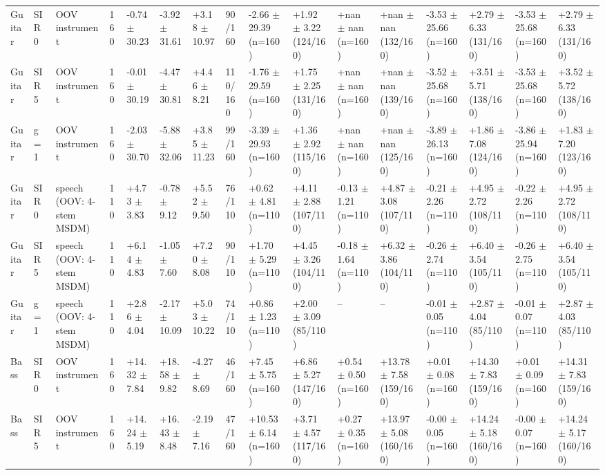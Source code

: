 \begin{tabular}{llllllllllllllll}
Guitar & SIR 0 & OOV instrument & 160 & -0.74 $\pm$ 30.23 & -3.92 $\pm$ 31.61 & +3.18 $\pm$ 10.97 & 90/160 & -2.66 $\pm$ 29.39 (n=160) & +1.92 $\pm$ 3.22 (124/160) & +nan $\pm$ nan (n=160) & +nan $\pm$ nan (132/160) & -3.53 $\pm$ 25.66 (n=160) & +2.79 $\pm$ 6.33 (131/160) & -3.53 $\pm$ 25.68 (n=160) & +2.79 $\pm$ 6.33 (131/160)\\
Guitar & SIR 5 & OOV instrument & 160 & -0.01 $\pm$ 30.19 & -4.47 $\pm$ 30.81 & +4.46 $\pm$ 8.21 & 110/160 & -1.76 $\pm$ 29.59 (n=160) & +1.75 $\pm$ 2.25 (131/160) & +nan $\pm$ nan (n=160) & +nan $\pm$ nan (139/160) & -3.52 $\pm$ 25.68 (n=160) & +3.51 $\pm$ 5.71 (138/160) & -3.53 $\pm$ 25.68 (n=160) & +3.52 $\pm$ 5.72 (138/160)\\
Guitar & g = 1 & OOV instrument & 160 & -2.03 $\pm$ 30.70 & -5.88 $\pm$ 32.06 & +3.85 $\pm$ 11.23 & 99/160 & -3.39 $\pm$ 29.93 (n=160) & +1.36 $\pm$ 2.92 (115/160) & +nan $\pm$ nan (n=160) & +nan $\pm$ nan (125/160) & -3.89 $\pm$ 26.13 (n=160) & +1.86 $\pm$ 7.08 (124/160) & -3.86 $\pm$ 25.94 (n=160) & +1.83 $\pm$ 7.20 (123/160)\\
Guitar & SIR 0 & speech (OOV: 4-stem MSDM) & 110 & +4.73 $\pm$ 3.83 & -0.78 $\pm$ 9.12 & +5.52 $\pm$ 9.50 & 76/110 & +0.62 $\pm$ 4.81 (n=110) & +4.11 $\pm$ 2.88 (107/110) & -0.13 $\pm$ 1.21 (n=110) & +4.87 $\pm$ 3.08 (107/110) & -0.21 $\pm$ 2.26 (n=110) & +4.95 $\pm$ 2.72 (108/110) & -0.22 $\pm$ 2.26 (n=110) & +4.95 $\pm$ 2.72 (108/110)\\
Guitar & SIR 5 & speech (OOV: 4-stem MSDM) & 110 & +6.14 $\pm$ 4.83 & -1.05 $\pm$ 7.60 & +7.20 $\pm$ 8.08 & 90/110 & +1.70 $\pm$ 5.29 (n=110) & +4.45 $\pm$ 3.26 (104/110) & -0.18 $\pm$ 1.64 (n=110) & +6.32 $\pm$ 3.86 (104/110) & -0.26 $\pm$ 2.74 (n=110) & +6.40 $\pm$ 3.54 (105/110) & -0.26 $\pm$ 2.75 (n=110) & +6.40 $\pm$ 3.54 (105/110)\\
Guitar & g = 1 & speech (OOV: 4-stem MSDM) & 110 & +2.86 $\pm$ 4.04 & -2.17 $\pm$ 10.09 & +5.03 $\pm$ 10.22 & 74/110 & +0.86 $\pm$ 1.23 (n=110) & +2.00 $\pm$ 3.09 (85/110) & -- & -- & -0.01 $\pm$ 0.05 (n=110) & +2.87 $\pm$ 4.04 (85/110) & -0.01 $\pm$ 0.07 (n=110) & +2.87 $\pm$ 4.03 (85/110)\\
Bass & SIR 0 & OOV instrument & 160 & +14.32 $\pm$ 7.84 & +18.58 $\pm$ 9.82 & -4.27 $\pm$ 8.69 & 46/160 & +7.45 $\pm$ 5.75 (n=160) & +6.86 $\pm$ 5.27 (147/160) & +0.54 $\pm$ 0.50 (n=160) & +13.78 $\pm$ 7.58 (159/160) & +0.01 $\pm$ 0.08 (n=160) & +14.30 $\pm$ 7.83 (159/160) & +0.01 $\pm$ 0.09 (n=160) & +14.31 $\pm$ 7.83 (159/160)\\
Bass & SIR 5 & OOV instrument & 160 & +14.24 $\pm$ 5.19 & +16.43 $\pm$ 8.48 & -2.19 $\pm$ 7.16 & 47/160 & +10.53 $\pm$ 6.14 (n=160) & +3.71 $\pm$ 4.57 (117/160) & +0.27 $\pm$ 0.35 (n=160) & +13.97 $\pm$ 5.08 (160/160) & -0.00 $\pm$ 0.05 (n=160) & +14.24 $\pm$ 5.18 (160/160) & -0.00 $\pm$ 0.07 (n=160) & +14.24 $\pm$ 5.17 (160/160)\\

\end{tabular}
